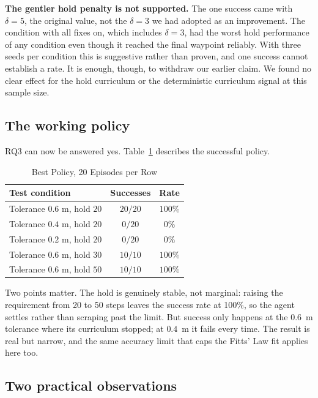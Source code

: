 \documentclass[conference]{IEEEtran}
\begin{document}
\textbf{The gentler hold penalty is not supported.} The one success came with
$\delta = 5$, the original value, not the $\delta = 3$ we had adopted as an
improvement. The condition with all fixes on, which includes $\delta = 3$, had
the worst hold performance of any condition even though it reached the final
waypoint reliably. With three seeds per condition this is suggestive rather
than proven, and one success cannot establish a rate. It is enough, though, to
withdraw our earlier claim. We found no clear effect for the hold curriculum or
the deterministic curriculum signal at this sample size.

\subsection{The working policy}

RQ3 can now be answered yes. Table~\ref{tab:champion} describes the successful
policy.

\begin{table}[htbp]
\caption{Best Policy, 20 Episodes per Row}
\begin{center}
\setlength{\tabcolsep}{5pt}
\begin{tabular}{lcc}
\toprule
\textbf{Test condition} & \textbf{Successes} & \textbf{Rate} \\
\midrule
Tolerance $0.6$ m, hold $20$ & $20/20$ & $100\%$ \\
Tolerance $0.4$ m, hold $20$ & $0/20$ & $0\%$ \\
Tolerance $0.2$ m, hold $20$ & $0/20$ & $0\%$ \\
\midrule
Tolerance $0.6$ m, hold $30$ & $10/10$ & $100\%$ \\
Tolerance $0.6$ m, hold $50$ & $10/10$ & $100\%$ \\
\bottomrule
\end{tabular}
\label{tab:champion}
\end{center}
\end{table}

Two points matter. The hold is genuinely stable, not marginal: raising the
requirement from 20 to 50 steps leaves the success rate at 100\%, so the agent
settles rather than scraping past the limit. But success only happens at the
$0.6$~m tolerance where its curriculum stopped; at $0.4$~m it fails every time.
The result is real but narrow, and the same accuracy limit that caps the Fitts'
Law fit applies here too.

\subsection{Two practical observations}
\label{sec:sensitivity}
\end{document}
